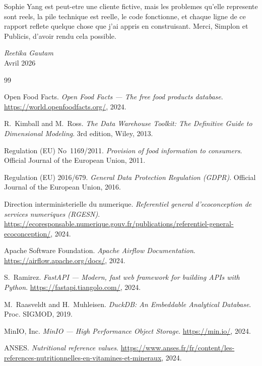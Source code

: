\documentclass[a4paper,11pt,oneside,openany]{report}
\begin{document}
\vspace{0.3cm}

\noindent Sophie Yang est peut-etre une cliente fictive, mais les
problemes qu'elle represente sont reels, la pile technique est reelle,
le code fonctionne, et chaque ligne de ce rapport reflete quelque
chose que j'ai appris en construisant. Merci, Simplon et Publicis,
d'avoir rendu cela possible.

\vspace{0.8cm}

\begin{center}
\textit{Reetika Gautam} \\
Avril 2026
\end{center}

\clearpage


\begin{thebibliography}{99}

Open Food Facts.
\textit{Open Food Facts --- The free food products database}.
\url{https://world.openfoodfacts.org/}, 2024.

R.~Kimball and M.~Ross.
\textit{The Data Warehouse Toolkit: The Definitive Guide to Dimensional
Modeling}. 3rd edition, Wiley, 2013.

Regulation (EU) No~1169/2011.
\textit{Provision of food information to consumers}.
Official Journal of the European Union, 2011.

Regulation (EU) 2016/679.
\textit{General Data Protection Regulation (GDPR)}.
Official Journal of the European Union, 2016.

Direction interministerielle du numerique.
\textit{Referentiel general d'ecoconception de services numeriques
(RGESN)}.
\url{https://ecoresponsable.numerique.gouv.fr/publications/referentiel-general-ecoconception/}, 2024.

Apache Software Foundation.
\textit{Apache Airflow Documentation}.
\url{https://airflow.apache.org/docs/}, 2024.

S.~Ramirez.
\textit{FastAPI --- Modern, fast web framework for building APIs with Python}.
\url{https://fastapi.tiangolo.com/}, 2024.

M.~Raasveldt and H.~Muhleisen.
\textit{DuckDB: An Embeddable Analytical Database}.
Proc. SIGMOD, 2019.

MinIO, Inc.
\textit{MinIO --- High Performance Object Storage}.
\url{https://min.io/}, 2024.

ANSES.
\textit{Nutritional reference values}.
\url{https://www.anses.fr/fr/content/les-references-nutritionnelles-en-vitamines-et-mineraux}, 2024.

\end{thebibliography}
\end{document}
